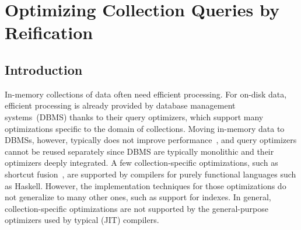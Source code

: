 

\part{Optimizing Collection Queries by Reification}
\label{part:ch-aosd13}

\chapter{Introduction}
\label{sec:aosd13-intro}
\label{ch:aosd13-intro}
In-memory collections of data often need efficient processing. For on-disk
data, efficient processing is already provided by database management systems~(DBMS) thanks to
their query optimizers, which support many optimizations specific to the domain
of collections. Moving in-memory data to DBMSs, however,
typically does not improve performance~\citep{Stonebraker07}, and query optimizers cannot
be reused separately since DBMS are typically monolithic and their optimizers deeply integrated.
A few collection-specific optimizations, such as shortcut
fusion~\citep{Gill93shortcut}, are supported by compilers for purely
functional languages such as Haskell. However, the implementation techniques for
those optimizations do not
generalize to many other ones, such as support for indexes. In
general, collection-specific optimizations are not supported by the general-purpose
optimizers used by typical (JIT) compilers.


